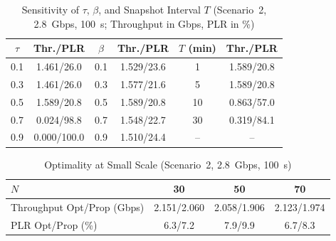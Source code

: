 \begin{table}[t]
\caption{Sensitivity of $\tau$, $\beta$, and Snapshot Interval $T$ (Scenario~2, 2.8~Gbps, 100~s; Throughput in Gbps, PLR in \%)}
\label{tab:sensitivity}
\centering
\footnotesize
\setlength{\tabcolsep}{3.5pt}
\begin{tabular}{cc|cc|cc}
\hline
$\tau$ & Thr./PLR & $\beta$ & Thr./PLR & $T$ (min) & Thr./PLR \\
\hline
0.1 & 1.461/26.0  & 0.1 & 1.529/23.6 & 1  & 1.589/20.8 \\
0.3 & 1.461/26.0  & 0.3 & 1.577/21.6 & 5  & 1.589/20.8 \\
0.5 & 1.589/20.8  & 0.5 & 1.589/20.8 & 10 & 0.863/57.0 \\
0.7 & 0.024/98.8  & 0.7 & 1.548/22.7 & 30 & 0.319/84.1 \\
0.9 & 0.000/100.0 & 0.9 & 1.510/24.4 & -- & --         \\
\hline
\end{tabular}
\end{table}

\begin{table}[t]
\caption{Optimality at Small Scale (Scenario~2, 2.8~Gbps, 100~s)}
\label{tab:optimality}
\centering
\footnotesize
\begin{tabular}{l|ccc}
\hline
$N$                              & 30          & 50          & 70          \\
\hline
Throughput Opt/Prop (Gbps)       & 2.151/2.060 & 2.058/1.906 & 2.123/1.974 \\
PLR Opt/Prop (\%)                & 6.3/7.2     & 7.9/9.9     & 6.7/8.3     \\
\hline
\end{tabular}
\end{table}
